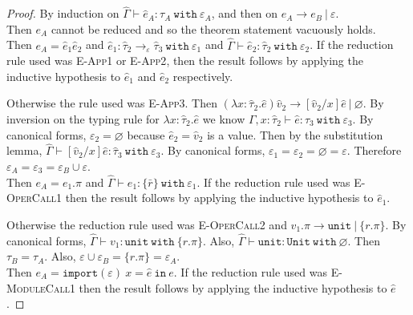\documentclass{llncs}
\newcommand{\keywadj}[1]{\mathtt{#1}}
\newcommand{\keyw}[1]{\keywadj{#1}~}
\newcommand{\kw}[1]{\keyw{ #1 }}
\newcommand{\kwa}[1]{\keywadj{ #1 }}
\newcommand{\module}[0]{
\kwa{import}(\varepsilon)~x = \hat e~\kwa{in}~e
}
\begin{document}
\begin{proof}
By induction on $\hat \Gamma \vdash \hat e_A: \tau_A~\kw{with }\varepsilon_A$, and then on $e_A \longrightarrow e_B~|~\varepsilon$. \\

\noindent
{} Then $e_A$ cannot be reduced and so the theorem statement vacuously holds. \\

\noindent
{}
Then $e_A = \hat e_1 \hat e_2$ and $\hat e_1: \hat \tau_2 \rightarrow_{\varepsilon} \hat \tau_3~\kw{with} \varepsilon_1$ and $\hat \Gamma \vdash \hat e_2: \hat \tau_2~\kw{with} \varepsilon_2$. If the reduction rule used was \textsc{E-App1} or \textsc{E-App2}, then the result follows by applying the inductive hypothesis to $\hat e_1$ and $\hat e_2$ respectively.

Otherwise the rule used was \textsc{E-App3}. Then $(\lambda x: \hat \tau_2.\hat e)\hat v_2 \longrightarrow [\hat v_2/x]\hat e~|~\varnothing$. By inversion on the typing rule for $\lambda x: \hat \tau_2.\hat e$ we know $\Gamma, x: \hat \tau_2 \vdash \hat e: \hat \tau_3~\kw{with} \varepsilon_3$. By canonical forms, $\varepsilon_2 = \varnothing$ because $\hat e_2 = \hat v_2$ is a value. Then by the substitution lemma, $\hat \Gamma \vdash [\hat v_2/x]\hat e : \hat \tau_3~\kw{with} \varepsilon_3$. By canonical forms, $\varepsilon_1 = \varepsilon_2 = \varnothing = \varepsilon$. Therefore $\varepsilon_A = \varepsilon_3 = \varepsilon_B \cup \varepsilon$.\\

\noindent
{}
Then $e_A = e_1.\pi$ and $\hat \Gamma \vdash e_1 : \{ \bar r \}~\kw{with} \varepsilon_1$. If the reduction rule used was \textsc{E-OperCall1} then the result follows by applying the inductive hypothesis to $\hat e_1$.

Otherwise the reduction rule used was \textsc{E-OperCall2} and $v_1.\pi \longrightarrow \kwa{unit}~|~\{ r.\pi \}$. By canonical forms, $\hat \Gamma \vdash v_1: \kwa{unit}~\kw{with} \{ r.\pi \}$. Also, $\hat \Gamma \vdash \kwa{unit}: \kwa{Unit}~\kw{with} \varnothing$. Then $\tau_B = \tau_A$. Also, $\varepsilon \cup \varepsilon_B = \{ r.\pi \} = \varepsilon_A$.\\

\noindent
{}
Then $e_A = \module$. If the reduction rule used was \textsc{E-ModuleCall1} then the result follows by applying the inductive hypothesis to $\hat e$.


\end{proof}
\end{document}
